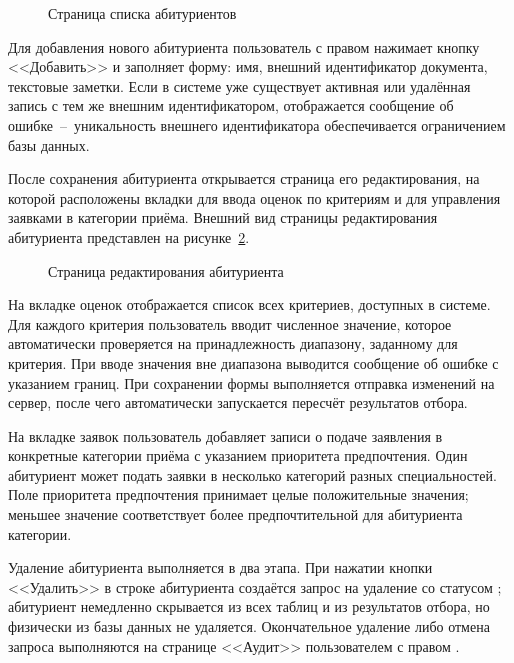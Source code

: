 \begin{figure}[htbp]
\centering
{}
\caption{Страница списка абитуриентов}
\label{fig:applicants}
\end{figure}

Для добавления нового абитуриента пользователь с правом  нажимает кнопку <<Добавить>> и заполняет форму: имя, внешний идентификатор документа, текстовые заметки.
Если в системе уже существует активная или удалённая запись с тем же внешним идентификатором, отображается сообщение об ошибке~--~уникальность внешнего идентификатора обеспечивается ограничением базы данных.

После сохранения абитуриента открывается страница его редактирования, на которой расположены вкладки для ввода оценок по критериям и для управления заявками в категории приёма.
Внешний вид страницы редактирования абитуриента представлен на рисунке~\ref{fig:applicantedit}.

\begin{figure}[htbp]
\centering
{}
\caption{Страница редактирования абитуриента}
\label{fig:applicantedit}
\end{figure}

На вкладке оценок отображается список всех критериев, доступных в системе.
Для каждого критерия пользователь вводит численное значение, которое автоматически проверяется на принадлежность диапазону, заданному для критерия.
При вводе значения вне диапазона выводится сообщение об ошибке с указанием границ.
При сохранении формы выполняется отправка изменений на сервер, после чего автоматически запускается пересчёт результатов отбора.

На вкладке заявок пользователь добавляет записи о подаче заявления в конкретные категории приёма с указанием приоритета предпочтения.
Один абитуриент может подать заявки в несколько категорий разных специальностей.
Поле приоритета предпочтения принимает целые положительные значения; меньшее значение соответствует более предпочтительной для абитуриента категории.

Удаление абитуриента выполняется в два этапа.
При нажатии кнопки <<Удалить>> в строке абитуриента создаётся запрос на удаление со статусом ; абитуриент немедленно скрывается из всех таблиц и из результатов отбора, но физически из базы данных не удаляется.
Окончательное удаление либо отмена запроса выполняются на странице <<Аудит>> пользователем с правом .


